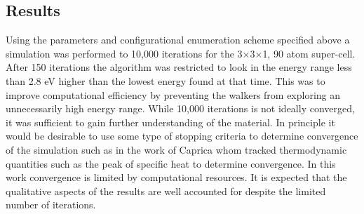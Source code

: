 \documentclass[aps,pre,reprint,superscriptaddress,showkeys]{revtex4-2}
\begin{document}
\subsection{Results}
  Using the parameters and configurational enumeration scheme specified above a simulation was performed to 10,000 iterations for  the 3$\times$3$\times$1,  90 atom super-cell. After 150 iterations the algorithm was restricted to look  in the energy range less than 2.8 eV higher than the lowest energy found at that time. This was to improve computational efficiency by preventing the walkers from exploring an unnecessarily high energy range. While 10,000 iterations is not ideally converged, it was sufficient to gain further understanding of the material. In principle it would be desirable to use some type of stopping criteria to determine convergence of the simulation such as in the work of Caprica\cite{halting_wang_and_landau} whom tracked thermodynamic quantities such as the peak of specific heat to determine convergence. In this work convergence is limited by computational resources.   
It is expected that the qualitative aspects of the results are well accounted for despite the limited number of iterations. 
\end{document}
